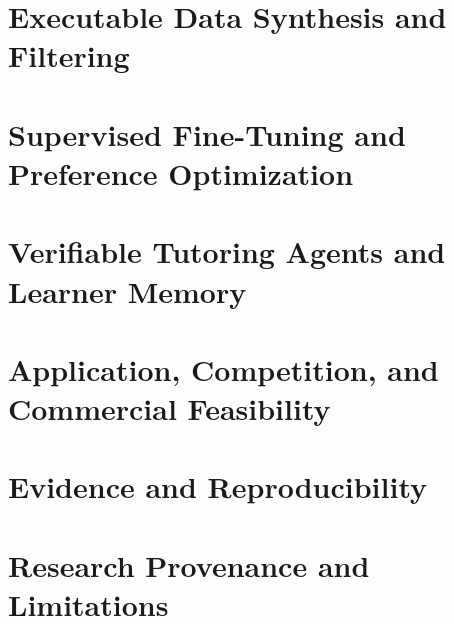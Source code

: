 \documentclass[11pt,a4paper,oneside,openany]{report}
\begin{document}

\clearpage{\small\linespread{0.98}\selectfont\setlength{\parskip}{0pt}\tableofcontents}
\clearpage{}
\chapter{Executable Data Synthesis and Filtering}\label{ch:data}\FloatBarrier
\chapter{Supervised Fine-Tuning and Preference Optimization}\label{ch:training}\FloatBarrier
\chapter{Verifiable Tutoring Agents and Learner Memory}\label{ch:agents}\FloatBarrier
\chapter{Application, Competition, and Commercial Feasibility}\label{ch:business}\FloatBarrier

\appendix
\chapter{Evidence and Reproducibility}\label{app:repro}\FloatBarrier
\chapter{Research Provenance and Limitations}\label{app:prompts}
\end{document}
